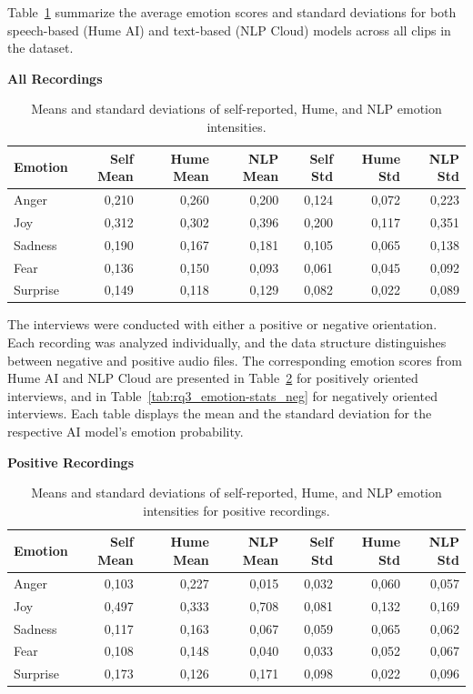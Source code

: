 Table~\ref{tab:rq3_emotion-stats-combined} summarize the average emotion scores and standard deviations for both speech-based (Hume AI) and text-based (NLP Cloud) 
models across all clips in the dataset. 

\begin{table}[H]
    \centering
    \caption*{\textbf{All Recordings}}
    \begin{tabular}{lrrrrrr}
      \toprule
      \textbf{Emotion} & \textbf{Self Mean} & \textbf{Hume Mean} & \textbf{NLP Mean} & \textbf{Self Std} & \textbf{Hume Std} & \textbf{NLP Std} \\
      \midrule
      Anger    & 0,210 & 0,260 & 0,200 & 0,124 & 0,072 & 0,223 \\
      Joy      & 0,312 & 0,302 & 0,396 & 0,200 & 0,117 & 0,351 \\
      Sadness  & 0,190 & 0,167 & 0,181 & 0,105 & 0,065 & 0,138 \\
      Fear     & 0,136 & 0,150 & 0,093 & 0,061 & 0,045 & 0,092 \\
      Surprise & 0,149 & 0,118 & 0,129 & 0,082 & 0,022 & 0,089 \\
      \bottomrule
    \end{tabular}
    \caption{Means and standard deviations of self-reported, Hume, and NLP emotion intensities.}
    \label{tab:rq3_emotion-stats-combined}
  \end{table}
  
  The interviews were conducted with either a positive or negative orientation. Each recording was analyzed individually, and
  the data structure distinguishes between negative and positive audio files. The corresponding emotion scores from Hume AI and 
  NLP Cloud are presented in Table~\ref{tab:rq3_emotion-stats-pos} for positively oriented interviews, and in Table~\ref{tab:rq3_emotion-stats_neg}
  for negatively oriented interviews. Each table displays the mean and the standard deviation for the respective AI model's emotion probability. 
  \begin{table}[H]
    \centering
    \caption*{\textbf{Positive Recordings}}
    \begin{tabular}{lrrrrrr}
      \toprule
      \textbf{Emotion} & \textbf{Self Mean} & \textbf{Hume Mean} & \textbf{NLP Mean} & \textbf{Self Std} & \textbf{Hume Std} & \textbf{NLP Std} \\
      \midrule
      Anger    & 0,103 & 0,227 & 0,015 & 0,032 & 0,060 & 0,057 \\
      Joy      & 0,497 & 0,333 & 0,708 & 0,081 & 0,132 & 0,169 \\
      Sadness  & 0,117 & 0,163 & 0,067 & 0,059 & 0,065 & 0,062 \\
      Fear     & 0,108 & 0,148 & 0,040 & 0,033 & 0,052 & 0,067 \\
      Surprise & 0,173 & 0,126 & 0,171 & 0,098 & 0,022 & 0,096 \\
      \bottomrule
    \end{tabular}
    \caption{Means and standard deviations of self-reported, Hume, and NLP emotion intensities for positive recordings.}
    \label{tab:rq3_emotion-stats-pos}
  \end{table}

